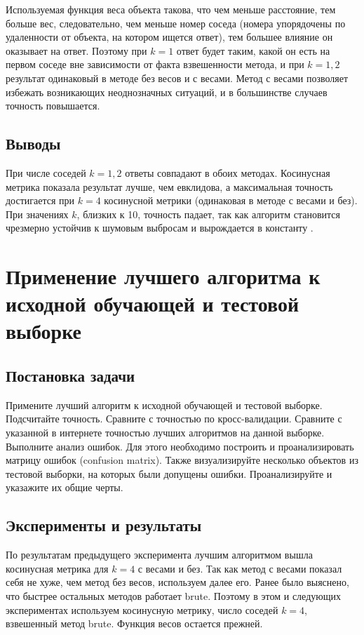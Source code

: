 \documentclass{article}
\begin{document}
Используемая функция веса объекта такова, что чем меньше расстояние, тем больше вес, следовательно, чем меньше номер соседа (номера упорядочены по удаленности от объекта, на котором ищется ответ), тем большее влияние он оказывает на ответ. Поэтому при $k=1$ ответ будет таким, какой он есть на первом соседе вне зависимости от факта взвешенности метода, и при $k=1,2$ результат одинаковый в методе без весов и с весами. Метод с весами позволяет избежать возникающих неоднозначных ситуаций, и в большинстве случаев точность повышается.

\subsection{Выводы}

При числе соседей $k=1,2$ ответы совпадают в обоих методах. Косинусная метрика показала результат лучше, чем евклидова, а максимальная точность достигается при $k=4$ косинусной метрики (одинаковая в методе с весами и без). При значениях $k$, близких к 10, точность падает, так как алгоритм становится чрезмерно устойчив к шумовым выбросам и вырождается в константу \cite{ss00}.



\section{Применение лучшего алгоритма к исходной обучающей и тестовой выборке}

\subsection{Постановка задачи}
Примените лучший алгоритм к исходной обучающей и тестовой выборке. Подсчитайте точность. Сравните с точностью по кросс-валидации. Сравните с указанной в интернете точностью лучших алгоритмов на данной выборке. Выполните анализ ошибок. Для этого необходимо построить и проанализировать матрицу ошибок (confusion matrix). Также визуализируйте несколько объектов из тестовой выборки, на которых были допущены ошибки. Проанализируйте и указажите их общие черты.

\subsection{Эксперименты и результаты}
По результатам предыдущего эксперимента лучшим алгоритмом вышла косинусная метрика для $k=4$ с весами и без. Так как метод с весами показал себя не хуже, чем метод без весов, используем далее его. Ранее было выяснено, что быстрее остальных методов работает brute. Поэтому в этом и следующих экспериментах используем косинусную метрику, число соседей $k=4$, взвешенный метод brute. Функция весов остается прежней.
\end{document}
